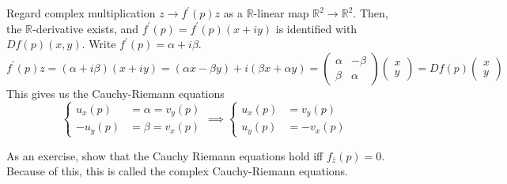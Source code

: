 	Regard complex multiplication $z \to f^\prime (p) z$ as a $\mathbb{R}$-linear map $\mathbb{R}^2 \to \mathbb{R}^2$. Then, the $\mathbb{R}$-derivative exists, and $f^\prime (p) = f^\prime (p) (x + iy)$ is identified with $Df(p)(x, y)$. Write $f^\prime (p) = \alpha + i \beta$. 
	\begin{equation}
		f^\prime (p) z = (\alpha + i \beta)(x + iy) = (\alpha x - \beta y) + i (\beta x + \alpha y) = \begin{pmatrix} \alpha & -\beta \\ \beta & \alpha \end{pmatrix} \begin{pmatrix} x \\ y \end{pmatrix} = Df(p) \begin{pmatrix} x \\ y \end{pmatrix}
	\end{equation}
	This gives us the Cauchy-Riemann equations
	\begin{equation}
		\begin{cases} u_x (p) & = \alpha = v_y (p) \\ -u_y (p) & = \beta = v_x (p) \end{cases} \implies \begin{cases} u_x (p) & = v_y (p) \\ u_y (p) & = -v_x (p) \end{cases} 
	\end{equation}

	\begin{example}
	  \label{ex:cauchy-riemann-via-the-wirtinger-derivative}
		As an exercise, show that the Cauchy Riemann equations hold iff $f_{\bar{z}} (p) = 0$. Because of this, this is called the complex Cauchy-Riemann equations. 
	\end{example}

